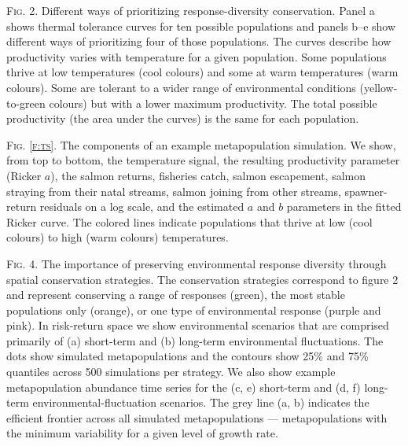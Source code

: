 \documentclass[12pt]{article}
\begin{document}
\begin{spacing}{1.9}
\bigskip
\noindent
\textsc{Fig. 2}. Different ways of prioritizing response-diversity conservation. Panel a shows thermal tolerance curves for ten possible populations and panels b--e show different ways of prioritizing four of those populations. The curves describe how productivity varies with temperature for a given population. Some populations thrive at low temperatures (cool colours) and some at warm temperatures (warm colours). Some are tolerant to a wider range of environmental conditions (yellow-to-green colours) but with a lower maximum productivity. The total possible productivity (the area under the curves) is the same for each population.


\bigskip
\noindent
\textsc{Fig. \ref{f:ts}}. The components of an example metapopulation simulation. We show, from top to bottom, the temperature signal, the resulting productivity parameter (Ricker $a$), the salmon returns, fisheries catch, salmon escapement, salmon straying from their natal streams, salmon joining from other streams, spawner-return residuals on a log scale, and the estimated $a$ and $b$ parameters in the fitted Ricker curve. The colored lines indicate populations that thrive at low (cool colours) to high (warm colours) temperatures.


\bigskip
\noindent
\textsc{Fig. 4}. The importance of preserving environmental response diversity through spatial conservation strategies. The conservation strategies correspond to figure 2 and represent conserving a range of responses (green), the most stable populations only (orange), or one type of environmental response (purple and pink). In risk-return space we show environmental scenarios that are comprised primarily of (a) short-term and (b) long-term environmental fluctuations. The dots show simulated metapopulations and the contours show 25\% and 75\% quantiles across 500 simulations per strategy. We also show example metapopulation abundance time series for the (c, e) short-term and (d, f) long-term environmental-fluctuation scenarios. The grey line (a, b) indicates the efficient frontier across all simulated metapopulations --- metapopulations with the minimum variability for a given level of growth rate.


\end{spacing}
\end{document}
